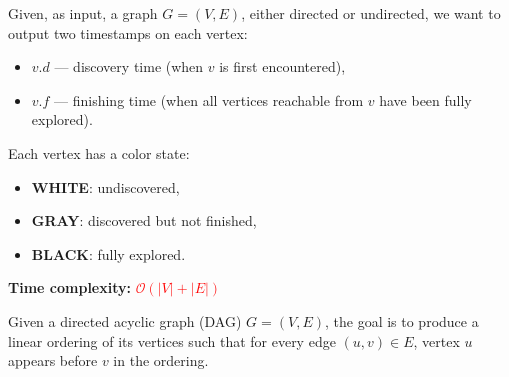 \documentclass[a4paper,landscape]{article}
\newcommand{\timecomplexity}[1]{\textcolor{red}{#1}}
\newcommand{\bigo}{\mathcal{O}}
\begin{document}
\begin{multicols}{7}
\tcolorbox[mybox={Depth-First Search}]
Given, as input, a graph $G = (V, E)$, either directed or undirected, we want to
output two timestamps on each vertex:
\begin{itemize}[noitemsep, topsep=0pt]
    \item $v.d$ — discovery time (when $v$ is first encountered),
    \item $v.f$ — finishing time (when all vertices reachable from $v$ have been fully explored).
\end{itemize}

Each vertex has a color state:
\begin{itemize}[noitemsep, topsep=0pt]
    \item \textbf{WHITE}: undiscovered,
    \item \textbf{GRAY}: discovered but not finished,
    \item \textbf{BLACK}: fully explored.
\end{itemize}

\noindent %
\textbf{Time complexity:} \timecomplexity{\(\bigo(|V| + |E|)\)} \quad
\endtcolorbox

\tcolorbox[mybox={Topological Sort}]
Given a directed acyclic graph (DAG) $G = (V, E)$, the goal is to produce a linear ordering of its vertices such that for every edge $(u, v) \in E$, vertex $u$ appears before $v$ in the ordering.


\end{multicols}
\end{document}
